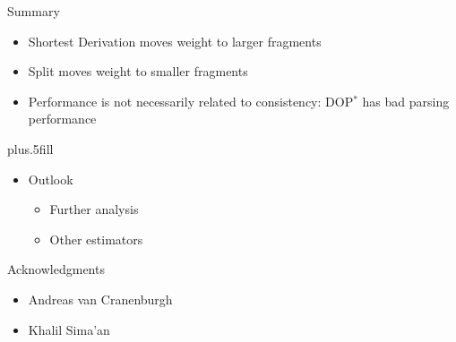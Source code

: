 \documentclass{beamer}
\newcommand{\dops}[0]{DOP$ ^*$}
\begin{document}
\begin{frame}{Summary}

  \begin{itemize}
  \item
    \alert{Shortest Derivation} moves weight to larger fragments
  \item
    \alert{Split} moves weight to smaller fragments

  \item
    \alert{Performance} is not necessarily related to \alert{consistency}:   \alert{\dops{}} has bad parsing performance

  \end{itemize}
  
  \vskip0pt plus.5fill
  \begin{itemize}
  \item
    Outlook


    \begin{itemize}
    \item Further analysis %
\item Other estimators 


    \end{itemize}
  \end{itemize}
\end{frame}

\begin{frame}{Acknowledgments}
\begin{itemize}
\item Andreas van Cranenburgh
\item Khalil Sima'an
\end{itemize}
\end{frame}
\end{document}
